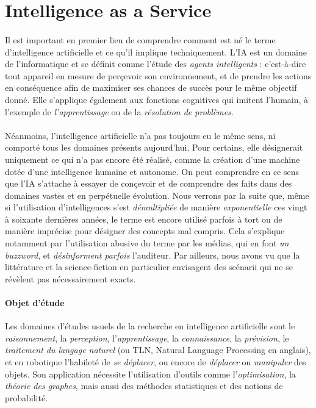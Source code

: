 \section{Intelligence as a Service}

\paragraph{} Il est important en premier lieu de comprendre comment est né le terme d'intelligence
artificielle et ce qu'il implique techniquement. L'IA est un domaine de l'informatique et se définit
comme l'étude des \emph{agents intelligents} : c'est-à-dire tout appareil en mesure de perçevoir son
environnement, et de prendre les actions en conséquence afin de maximiser ses chances de succès pour
le même objectif donné. \cite{AI0} Elle s'applique également aux fonctions cognitives qui
imitent l'humain, à l'exemple de \emph{l'apprentissage} ou de la \emph{résolution de problèmes}.

\paragraph{} Néanmoins, l'intelligence artificielle n'a pas toujours eu le même sens, ni comporté
tous les domaines présents aujourd'hui. Pour certains, elle désignerait uniquement ce qui n'a
pas encore été réalisé, comme la création d'une machine dotée d'une intelligence humaine et autonome.
On peut comprendre en ce sens que l'IA s'attache à essayer de conçevoir et de comprendre des faits
dans des domaines vastes et en perpétuelle évolution. Nous verrons par la suite que, même si
l'utilisation d'intelligences s'est \emph{démultipliée} de manière \emph{exponentielle} ces vingt
à soixante dernières années, le terme est encore utilisé parfois à tort ou de manière imprécise 
pour désigner des concepts mal compris. Cela s'explique notamment par l'utilisation abusive du terme 
par les médias, qui en font \emph{un buzzword}, et \emph{désinforment parfois} l'auditeur.
Par ailleurs, nous avons vu que la littérature et la science-fiction en particulier envisagent des
scénarii qui ne se révèlent pas nécessairement exacts. 

\paragraph{Objet d'étude} Les domaines d'études usuels de la recherche en intelligence artificielle sont le
\emph{raisonnement}, la \emph{perception}, l'\emph{apprentissage}, la \emph{connaissance}, la
\emph{prévision}, le \emph{traitement du langage naturel} (ou TLN, Natural Language Processing en anglais),
et en robotique l'habileté de \emph{se déplacer}, ou encore de \emph{déplacer} ou \emph{manipuler} des
objets. Son application nécessite l'utilisation d'outils comme l'\emph{optimisation}, la \emph{théorie des graphes},
mais aussi des méthodes statistiques et des notions de probabilité. 

